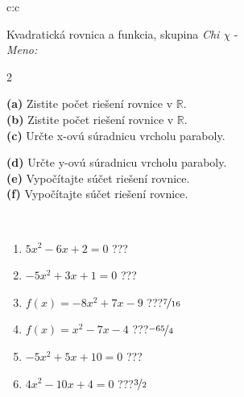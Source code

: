 \documentclass[10pt]{report}
\begin{document}
\begin{tabular}{c:c}
\begin{minipage}[c][104.5mm][t]{0.5\linewidth}
\begin{center}
\vspace{7mm}
{\huge {\LARGE Kvadratická rovnica a funkcia}, skupina \textit{Chi $\chi$} -}\\[5mm]
\textit{Meno:}\phantom{xxxxxxxxxxxxxxxxxxxxxxxxxxxxxxxxxxxxxxxxxxxxxxxxxxxxxxxxxxxxxxxxx}\\[5mm]
\begin{minipage}{0.95\linewidth}
\begin{center}
{\small \begin{multicols}{2} \raggedright
\textbf{(a)} Zistite počet riešení rovnice v \(\mathbb{R}\). \\[1mm]
\textbf{(b)} Zistite počet riešení rovnice v \(\mathbb{R}\). \\[1mm]
\textbf{(c)} Určte x-ovú súradnicu vrcholu paraboly. \par \columnbreak
\textbf{(d)} Určte y-ovú súradnicu vrcholu paraboly. \\[1mm]
\textbf{(e)} Vypočítajte súčet riešení rovnice. \\[1mm]
\textbf{(f)} Vypočítajte súčet riešení rovnice.
\end{multicols}
}
\end{center}
\end{minipage}
\\[4mm]
\begin{minipage}{0.79\linewidth}
\begin{center}
\begin{varwidth}{\linewidth}
\begin{enumerate}
\Large
\item $5x^2-6x+2=0$\quad \dotfill\; ???\;\dotfill {}
\item $-5x^2+3x+1=0$\quad \dotfill\; ???\;\dotfill {}
\item $f(x)=-8x^2+7x-9$\quad \dotfill\; ???\;\dotfill \quad $\nicefrac{7}{16}$
\item $f(x)=x^2-7x-4$\quad \dotfill\; ???\;\dotfill \quad $\nicefrac{-65}{4}$
\item $-5x^2+5x+10=0$\quad \dotfill\; ???\;\dotfill {}
\item $4x^2-10x+4=0$\quad \dotfill\; ???\;\dotfill \quad $\nicefrac{3}{2}$
\end{enumerate}
\end{varwidth}
\end{center}

\end{minipage}
\end{center}
\end{minipage}
\end{tabular}
\end{document}
